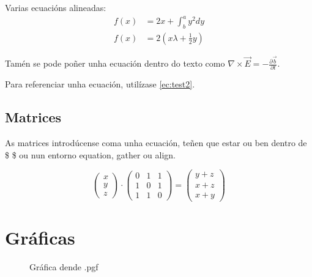 \documentclass[12pt, a4paper, titlepage]{article}
\begin{document}
  Varias ecuacións alineadas:
  \begin{align} %
    f(x) &= 2x + \int^a_b y^2 dy \label{ec:test3} \\
    f(x) &= 2 (x\lambda + \frac{1}{2}y) \label{ec:test4}
  \end{align}

  Tamén se pode poñer unha ecuación dentro do texto como $\nabla \times \vec{E} = -\frac{\partial{\vec{b}}}{\partial{t}}$\cite{griffiths_2018}.

  Para referenciar unha ecuación, utilízase \ref{ec:test2}.

  \subsection{Matrices}

  As matrices introdúcense coma unha ecuación, teñen que estar ou ben dentro de \$ \$ ou nun entorno equation, gather ou align.

  \begin{equation*}
  \left( %
    \begin{matrix}
      x\\
      y\\
      z
    \end{matrix}
  \right)
  \cdot
  \left(
    \begin{matrix}
      0 & 1 & 1\\
      1 & 0 & 1\\
      1 & 1 & 0
    \end{matrix}
  \right)
  =
  \left(
    \begin{matrix}
      y+z\\
      x+z\\
      x+y
    \end{matrix}
  \right)
  \end{equation*}


  \section{Gráficas}

  \begin{figure}[H] %
    \hspace{12pt}
    
    \caption{Gráfica dende .pgf}
  \end{figure}
\end{document}
